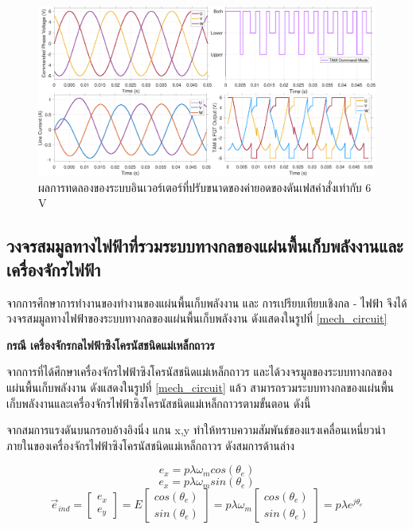 \documentclass[11pt,a4paper]{article}
\begin{document}
\begin{figure}[H]
    \centering
    \includegraphics[width=\textwidth]{6V.pdf}
    \caption{ผลการทดลองของระบบอินเวอร์เตอร์ที่ปรับขนาดของค่ายอดของดันเฟสคำสั่งเท่ากับ 6 V}
    \label{6V}
\end{figure}





\subsection{วงจรสมมูลทางไฟฟ้าที่รวมระบบทางกลของแผ่นพื้นเก็บพลังงานและเครื่องจักรไฟฟ้า}
จากการศึกษาการทำงานของทำงานของแผ่นพื้นเก็บพลังงาน และ การเปรียบเทียบเชิงกล - ไฟฟ้า จึงได้วงจรสมมูลทางไฟฟ้าของระบบทางกลของแผ่นพื้นเก็บพลังงาน ดังแสดงในรูปที่ \ref{mech_circuit} 

\textbf{กรณี เครื่องจักรกลไฟฟ้าซิงโครนัสชนิดแม่เหล็กถาวร}

จากการที่ได้ศึกษาเครื่องจักรไฟฟ้าซิงโครนัสชนิดแม่เหล็กถาวร และได้วงจรมูลของระบบทางกลของแผ่นพื้นเก็บพลังงาน ดังแสดงในรูปที่ \ref{mech_circuit} แล้ว สามารถรวมระบบทางกลของแผ่นพื้นเก็บพลังงานและเครื่องจักรไฟฟ้าซิงโครนัสชนิดแม่เหล็กถาวรตามขั้นตอน ดังนี้

จากสมการแรงดันบนกรอบอ้างอิงนิ่ง แกน x,y ทำให้ทราบความสัมพันธ์ของแรงเคลื่อนเหนี่ยวนำภายในของเครื่องจักรไฟฟ้าซิงโครนัสชนิดแม่เหล็กถาวร ดังสมการด้านล่าง

\begin{equation}
    e_{x} = p \lambda \omega_{m} cos(\theta_{e})
\end{equation}
\begin{equation}
    e_{x} = p \lambda \omega_{m} sin(\theta_{e})
\end{equation}
\begin{equation}
    \vec{e}_{ind} =
    \begin{bmatrix}
        e_{x} \\ e_{y}
    \end{bmatrix} = E
    \begin{bmatrix}
        cos(\theta_{e}) \\ sin(\theta_{e})
    \end{bmatrix} = p \lambda \omega_{m}
    \begin{bmatrix}
        cos(\theta_{e}) \\ sin(\theta_{e})
    \end{bmatrix} =
    p \lambda e^{j\theta_{e}}
\end{equation}
\end{document}
